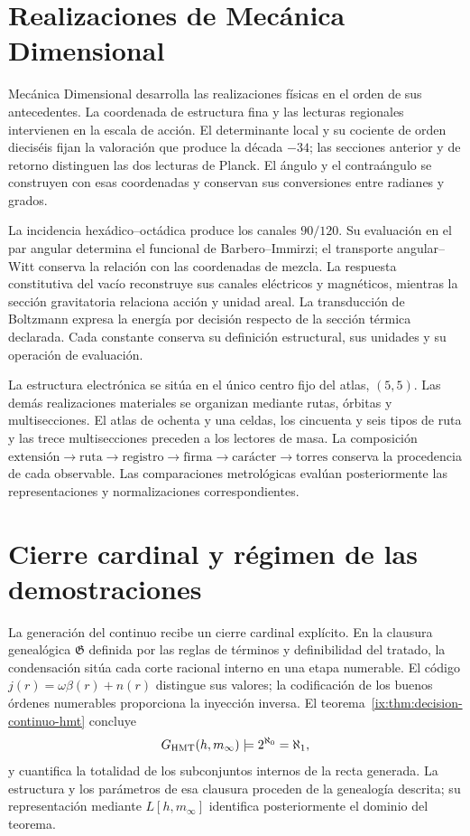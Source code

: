 \section*{Realizaciones de Mecánica Dimensional}

Mecánica Dimensional desarrolla las realizaciones físicas en el orden
de sus antecedentes. La coordenada de estructura fina y las lecturas
regionales intervienen en la escala de acción. El determinante local
y su cociente de orden dieciséis fijan la valoración que produce
la década \(-34\); las secciones anterior y de retorno distinguen
las dos lecturas de Planck. El ángulo y el contraángulo se construyen
con esas coordenadas y conservan sus conversiones entre radianes
y grados.

La incidencia hexádico--octádica produce los canales \(90/120\).
Su evaluación en el par angular determina el funcional de
Barbero--Immirzi; el transporte angular--Witt conserva la relación
con las coordenadas de mezcla. La respuesta constitutiva del vacío
reconstruye sus canales eléctricos y magnéticos, mientras la
sección gravitatoria relaciona acción y unidad areal. La
transducción de Boltzmann expresa la energía por decisión respecto
de la sección térmica declarada. Cada constante conserva su
definición estructural, sus unidades y su operación de evaluación.

La estructura electrónica se sitúa en el único centro fijo del
atlas, \((5,5)\). Las demás realizaciones materiales se organizan
mediante rutas, órbitas y multisecciones. El atlas de ochenta y una
celdas, los cincuenta y seis tipos de ruta y las trece
multisecciones preceden a los lectores de masa. La composición
\(\text{extensión}\to\text{ruta}\to\text{registro}\to
\text{firma}\to\text{carácter}\to\text{torres}\)
conserva la procedencia de cada observable. Las comparaciones
metrológicas evalúan posteriormente las representaciones y
normalizaciones correspondientes.

\section*{Cierre cardinal y régimen de las demostraciones}

La generación del continuo recibe un cierre cardinal explícito.
En la clausura genealógica \(\mathfrak G\) definida por las reglas
de términos y definibilidad del tratado, la condensación sitúa
cada corte racional interno en una etapa numerable. El código
\(j(r)=\omega\beta(r)+n(r)\) distingue sus valores; la codificación
de los buenos órdenes numerables proporciona la inyección inversa.
El teorema~\ref{ix:thm:decision-continuo-hmt} concluye
\[
 \mathfrak G_{\rm HMT}(h,m_\infty)
 \models 2^{\aleph_0}=\aleph_1,
\]
y cuantifica la totalidad de los subconjuntos internos de la recta
generada. La estructura y los parámetros de esa clausura proceden
de la genealogía descrita; su representación mediante
\(L[h,m_\infty]\) identifica posteriormente el dominio del teorema.

